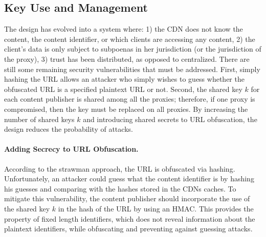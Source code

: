\subsection{Key Use and Management}
\label{sec:keys}
The design has evolved into a system where: 1) the CDN does not know the content, the content identifier, 
or which clients are accessing any content, 2) the client's data is only subject to subpoenas in her jurisdiction 
(or the jurisdiction of the proxy), 3) trust has been distributed, as opposed to centralized.  There are still 
some remaining security vulnerabilities that must be addressed.  First, simply hashing the URL allows an attacker who simply 
wishes to guess whether the obfuscated URL is a specified plaintext URL or not.  Second, the shared key $k$ for each content 
publisher is shared among all the proxies; therefore, if one proxy is compromised, then the key must be replaced 
on all proxies.  By increasing the number of shared keys $k$ and introducing shared secrets to URL obfuscation, 
the design reduces the probability of attacks.

\paragraph{Adding Secrecy to URL Obfuscation.} According to the strawman approach, the URL is obfuscated via hashing.  Unfortunately, 
an attacker could guess what the content identifier is by hashing his guesses and comparing with the hashes stored in the 
CDNs caches.  To mitigate this vulnerability, the content publisher should incorporate the use of the shared key $k$ in the 
hash of the URL by using an HMAC.  This provides the property of fixed length identifiers, which does not reveal information about 
the plaintext identifiers, while obfuscating and preventing 
against guessing attacks.  

